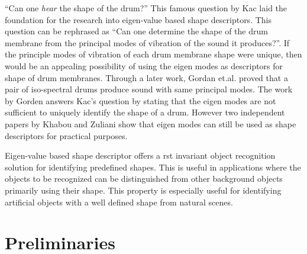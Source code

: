 \documentclass {udthesis}
\begin{document}
``Can one \emph{hear} the shape of the drum?'' This famous question by Kac \cite{kac} laid the foundation for the research into eigen-value based shape descriptors.
This question can be rephrased as ``Can one determine the shape of the drum membrane from the principal modes of vibration of the sound it produces?''.
If the principle modes of vibration of each drum membrane shape were unique, then would be an appealing possibility of using the eigen modes as descriptors for shape of drum membranes. 
Through a later work, Gordan et.al.\cite{gordon} proved that a pair of iso-spectral drums produce sound with same principal modes. The work by Gorden answers Kac's question by stating that the eigen modes are not sufficient to uniquely identify the shape of a drum. However two independent papers by Khabou and Zuliani \cite{khabou,zuliani} show that eigen modes can still be used as shape descriptors for practical purposes.

Eigen-value based shape descriptor offers a \gls{rst} invariant object recognition solution for identifying predefined shapes. This is useful in applications where the objects to be recognized can be distinguished from other background objects primarily using their shape. This property is especially useful for identifying artificial objects with a well defined shape from natural scenes.


\section{Preliminaries}
\end{document}
